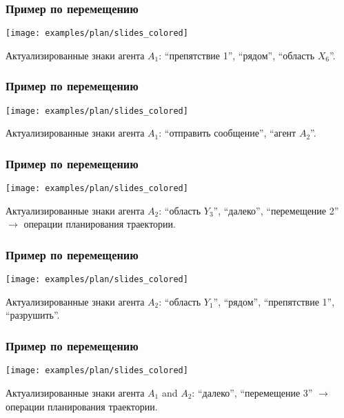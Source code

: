 \documentclass[default]{beamer}
\begin{document}
	\begin{frame}
		\frametitle{Пример по перемещению}
		
		\begin{center}
			\texttt{[image: examples/plan/slides\_colored]}
		\end{center}
		\par\bigskip
		Актуализированные знаки агента $A_1$: ``препятствие 1'', ``рядом'', ``область $X_6$''.
	\end{frame}
	
	\begin{frame}
		\frametitle{Пример по перемещению}
		
		\begin{center}
			\texttt{[image: examples/plan/slides\_colored]}
		\end{center}
		\par\bigskip
		Актуализированные знаки агента $A_1$: ``отправить сообщение'', ``агент $A_2$''.
	\end{frame}
	
	\begin{frame}
		\frametitle{Пример по перемещению}
		
		\begin{center}
			\texttt{[image: examples/plan/slides\_colored]}
		\end{center}
		\par\bigskip
		Актуализированные знаки агента $A_2$: ``область $Y_3$'', ``далеко'', ``перемещение 2'' $\rightarrow$ \color{green!70!black} операции планирования траектории.
	\end{frame}
	
	\begin{frame}
		\frametitle{Пример по перемещению}
		
		\begin{center}
			\texttt{[image: examples/plan/slides\_colored]}
		\end{center}
		\par\bigskip
		Актуализированные знаки агента $A_2$: ``область $Y_1$'', ``рядом'', ``препятствие 1'', ``разрушить''.
	\end{frame}
	
	\begin{frame}
		\frametitle{Пример по перемещению}
		
		\begin{center}
			\texttt{[image: examples/plan/slides\_colored]}
		\end{center}
		\par\bigskip
		Актуализированные знаки агента $A_1$ and $A_2$: ``далеко'', ``перемещение 3'' $\rightarrow$ \color{green!70!black} операции планирования траектории.
	\end{frame}
	
\end{document}
